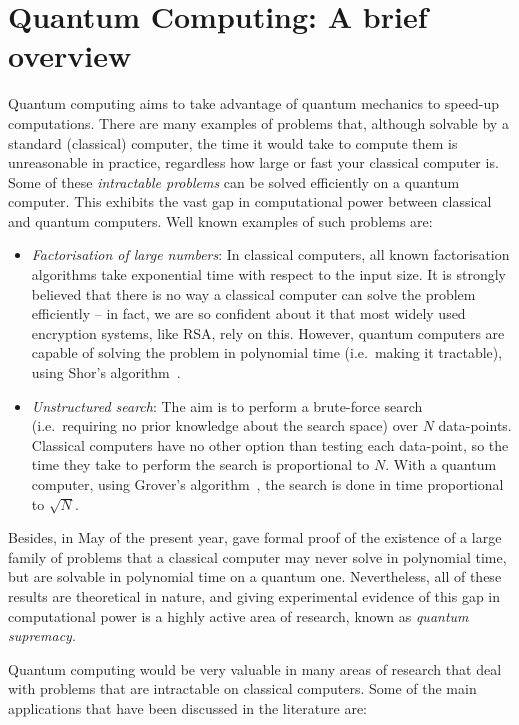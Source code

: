 \chapter{Quantum Computing: A brief overview}

Quantum computing aims to take advantage of quantum mechanics to speed-up computations. There are many examples of problems that, although solvable by a standard (classical) computer, the time it would take to compute them is unreasonable in practice, regardless how large or fast your classical computer is. Some of these \textit{intractable problems} can be solved efficiently on a quantum computer. This exhibits the vast gap in computational power between classical and quantum computers. Well known examples of such problems are:

\begin{itemize} 
  \item \textit{Factorisation of large numbers}: In classical computers, all known factorisation algorithms take exponential time with respect to the input size. It is strongly believed that there is no way a classical computer can solve the problem efficiently -- in fact, we are so confident about it that most widely used encryption systems, like RSA, rely on this. However, quantum computers are capable of solving the problem in polynomial time (i.e.\ making it tractable), using Shor's algorithm~\citep{Shor}.
  \item \textit{Unstructured search}: The aim is to perform a brute-force search (i.e.\ requiring no prior knowledge about the search space) over \(N\) data-points. Classical computers have no other option than testing each data-point, so the time they take to perform the search is proportional to \(N\). With a quantum computer, using Grover's algorithm~\citep{Grover}, the search is done in time proportional to \(\sqrt{N}\).
\end{itemize}

Besides, in May of the present year, \citet{BQPSepPH} gave formal proof of the existence of a large family of problems that a classical computer may never solve in polynomial time, but are solvable in polynomial time on a quantum one. Nevertheless, all of these results are theoretical in nature, and giving experimental evidence of this gap in computational power is a highly active area of research, known as \textit{quantum supremacy}. 

Quantum computing would be very valuable in many areas of research that deal with problems that are intractable on classical computers. Some of the main applications that have been discussed in the literature are:

